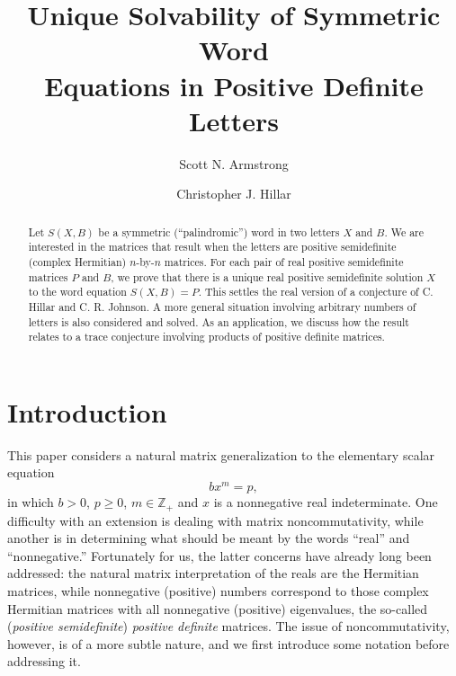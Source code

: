 \documentclass{amsart}
\theoremstyle{definition}
\theoremstyle{remark}
\numberwithin{equation}{section}
\newcommand{\bbold}{\mathbb}
\newcommand{\<}{\langle}
\renewcommand{\>}{\rangle}
\def \Z { {\bbold Z} }
\begin{document}
\title[Symmetric Word Equations]{Unique Solvability of Symmetric Word \\ Equations in Positive Definite Letters}%

\author[S. N. Armstrong]{Scott N. Armstrong}
\address{Department of Mathematics, University of California, Berkeley, CA 94720}

\author[C.J. Hillar]{Christopher J. Hillar}
\address{Department of Mathematics, University of California, Berkeley, CA 94720}


\begin{abstract}
Let $S(X,B)$ be a symmetric (``palindromic'') word in two letters  $X$ and $B$. We are interested in the matrices that result when the letters
are positive semidefinite (complex Hermitian) $n$-by-$n$
matrices.  For each pair of real positive semidefinite matrices $P$ and $B$, we prove that there is a unique real positive semidefinite solution $X$ to the word equation $S(X,B) = P$.  This settles the real version of a conjecture of C. Hillar and C. R. Johnson.  A more general situation involving arbitrary numbers of letters is also considered and solved.  As an application, we discuss how the result relates to a trace conjecture involving products of positive definite matrices.
\end{abstract}
\maketitle

\section{Introduction}

This paper considers a natural matrix generalization to the elementary scalar equation \[bx^m = p,\] in which $b > 0$, $p \geq 0$, $m \in \Z_+$ and $x$ is a nonnegative real indeterminate.  One difficulty with an extension is dealing with matrix noncommutativity, while another is in determining what should be meant by the words ``real'' and ``nonnegative.''  Fortunately for us, the latter concerns have already long been addressed:  the natural matrix interpretation of the reals are the Hermitian matrices, while nonnegative (positive) numbers correspond to those complex Hermitian matrices with all nonnegative (positive) eigenvalues, the so-called (\textit{positive semidefinite}) \textit{positive definite} matrices.  The issue of noncommutativity, however, is of a more subtle nature, and we first introduce some notation before addressing it.  
\end{document}
